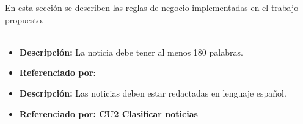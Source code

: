 

En esta sección se describen las reglas de negocio implementadas en el trabajo propuesto.\\\\


\begin{itemize}
  \item \textbf{Descripción:}  La noticia debe tener al menos 180 palabras.
  \item \textbf{Referenciado por}: 
\end{itemize}


\begin{itemize}
  \item \textbf{Descripción:} Las noticias deben estar redactadas en lenguaje español.
  \item \textbf{Referenciado por: CU2 Clasificar noticias}  \\
\end{itemize}

